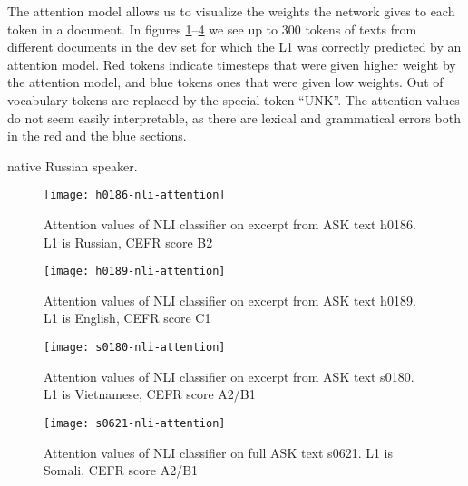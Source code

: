 The attention model allows us to visualize the weights the network gives to
each token in a document. In figures
\ref{fig:h0186-nli-attention}--\ref{fig:s0621-nli-attention} we see up to 300
tokens of texts from different documents in the dev set for which the L1 was
correctly predicted by an attention model. Red tokens indicate timesteps that
were given higher weight by the attention model, and blue tokens ones that
were given low weights. Out of vocabulary tokens are replaced by the special
token ``UNK''. The attention values do not seem easily interpretable, as
there are lexical and grammatical errors both in the red and the blue
sections.

native Russian speaker.  

\begin{figure}
  \centering
  \texttt{[image: h0186-nli-attention]}
  \caption{Attention values of NLI classifier on excerpt from ASK text h0186.
           L1 is Russian, CEFR score B2}
  \label{fig:h0186-nli-attention}
\end{figure}

\begin{figure}
  \centering
  \texttt{[image: h0189-nli-attention]}
  \caption{Attention values of NLI classifier on excerpt from ASK text h0189.
           L1 is English, CEFR score C1}
  \label{fig:h0189-nli-attention}
\end{figure}

\begin{figure}
  \centering
  \texttt{[image: s0180-nli-attention]}
  \caption{Attention values of NLI classifier on excerpt from ASK text s0180.
           L1 is Vietnamese, CEFR score A2/B1}
  \label{fig:s0180-nli-attention}
\end{figure}

\begin{figure}
  \centering
  \texttt{[image: s0621-nli-attention]}
  \caption{Attention values of NLI classifier on full ASK text s0621.
           L1 is Somali, CEFR score A2/B1}
  \label{fig:s0621-nli-attention}
\end{figure}
